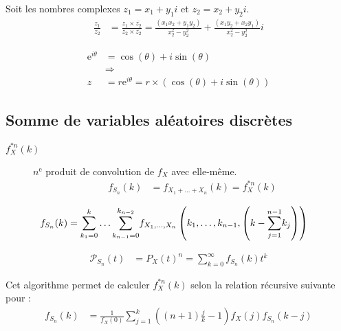 \documentclass[10pt, french]{article}
\begin{document}
\begin{multicols*}{2}
\begin{definitionNOHFILLpropos}
Soit les nombres complexes $z_{1}	=	x_{1} + y_{1}i$ et $z_{2}	=	x_{2} + y_{2}i$.\\
\begin{align*}
	\frac{z_{1}}{z_{2}}
	&=	\frac{z_{1} \times \overline{z_{2}}}{z_{2} \times \overline{z_{2}}}
	=	\frac{(x_{1}x_{2} + y_{1}y_{2})}{x_{2}^{2} - y_{2}^{2}} + \frac{(x_{1}y_{2} + x_{2}y_{1})}{x_{2}^{2} - y_{2}^{2}}i
\end{align*}
\end{definitionNOHFILLpropos}

\begin{definitionNOHFILLprop}
\begin{align*}
	\textrm{e}^{i\theta}
	&=	\cos(\theta) + i\sin(\theta)	\\
	&\Rightarrow	\\
	z
	&=	r\textrm{e}^{i\theta}
	=	r\times\left(\cos(\theta) + i\sin(\theta)\right)
\end{align*}
\end{definitionNOHFILLprop}

\columnbreak
\subsection{Somme de variables aléatoires discrètes}
\begin{distributions}[Notation]
\begin{description}
	\item[$f_{X}^{\ast n}(k)$]	$n^{\text{e}}$ produit de convolution de $f_{X}$ avec elle-même.	
		\begin{align*}
			f_{S_{n}}(k)	
			&=	f_{X_{1} + \dots + X_{n}}(k)	=	f_{X}^{\ast n}(k)
		\end{align*}
\end{description}
\end{distributions}

\begin{align*}
	f_{S_{n}}(k)
	&=	\overset{k}{\underset{k_{1}	=	0}{\sum}}\dots\overset{k_{n	-	2}}{\underset{k_{n	-	1}	=	0}{\sum}} 
	f_{X_{1}, \dots, X_{n}}\left(k_{1}, \dots, k_{n - 1}, \left(k - \overset{n	-	1}{\underset{j	=	1}{\sum}}k_{j} \right) \right)
\end{align*}

\begin{align*}
	\mathcal{P}_{S_{n}}(t)
	&=	P_{X}(t)^{n}	
	=	\sum_{k = 0}^{\infty} f_{S_{n}}(k) t^{k}
\end{align*}

\begin{algo2}
Cet algorithme permet de calculer $f_{X}^{\ast n}(k)$ selon la relation récursive suivante pour  :
\begin{align*}
	f_{S_{n}}(k)
	&=	\frac{1}{f_{X}(0)} \sum_{j = 1}^{k} \left((n + 1)\frac{j}{k} - 1\right)f_{X}(j)f_{S_{n}}(k - j)
\end{align*}


\end{algo2}
\end{multicols*}
\end{document}
